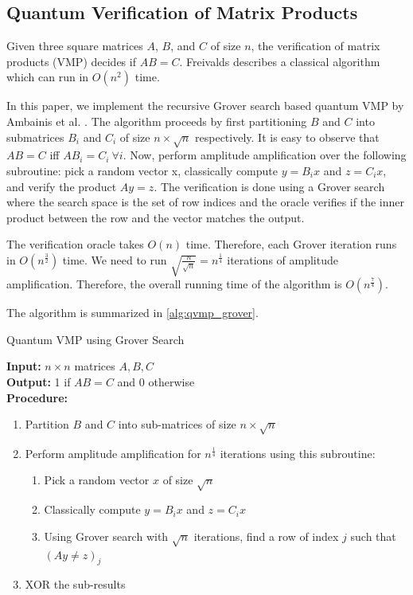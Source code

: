 \documentclass[11pt]{article}
\theoremstyle{definition}
\theoremstyle{remark}
\begin{document}
\subsection{Quantum Verification of Matrix Products}

Given three square matrices $A$, $B$, and $C$ of size $n$, the verification of
matrix products (VMP) decides if $AB = C$. Freivalds describes a classical
algorithm which can run in $O(n^2)$ time.

In this paper, we implement the recursive Grover search based quantum VMP by
Ambainis et al. \cite{ambainis2002quantummatrix}. The algorithm proceeds by first
partitioning $B$ and $C$ into submatrices $B_i$ and $C_i$ of size $n \times
\sqrt{n}$ respectively. It is easy to observe that $AB = C$ iff $AB_i = C_i \
\forall i$. Now, perform amplitude amplification over the following subroutine:
pick a random vector x, classically compute $y = B_ix$ and $z = C_ix$, and
verify the product $Ay = z$. The verification is done using a Grover search
where the search space is the set of row indices and the oracle verifies if the
inner product between the row and the vector matches the output.

The verification oracle takes $O(n)$ time. Therefore, each Grover iteration
runs in $O(n^{\frac{3}{2}})$ time. We need to run $\sqrt{\frac{n}{\sqrt{n}}} =
n^{\frac{1}{4}}$ iterations of amplitude amplification. Therefore, the overall
running time of the algorithm is $O(n^{\frac{7}{4}})$.

The algorithm is summarized in \cref{alg:qvmp_grover}.

\begin{algorithm}
  \caption{Quantum VMP using Grover Search \cite{lanl2018quantum}}
  \label{alg:qvmp_grover}
  \textbf{Input: } $n \times n$ matrices $A, B, C$ \\
  \textbf{Output: } 1 if $AB = C$ and 0 otherwise \\
  \textbf{Procedure: }
  \begin{enumerate}
    \item Partition $B$ and $C$ into sub-matrices of size $n \times \sqrt{n}$
    \item 
      {
        Perform amplitude amplification for $n^{\frac{1}{4}}$ iterations using this subroutine:
        \begin{enumerate}
          \item Pick a random vector $x$ of size $\sqrt{n}$
          \item Classically compute $y = B_ix$ and $z = C_ix$
          \item Using Grover search with $\sqrt{n}$ iterations, find a row of
            index $j$ such that $(Ay \neq z)_j$
        \end{enumerate}
      }
    \item XOR the sub-results
  \end{enumerate}
\end{algorithm}
\end{document}

